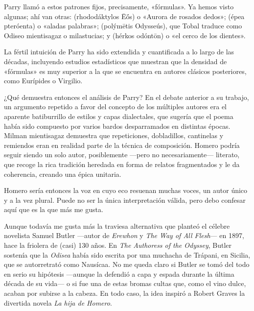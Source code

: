 Parry llamó a estos patrones fijos, precisamente, «fórmulas». Ya hemos visto algunas; ahí van otras:  (rhododáktylos Ēṓs) o «Aurora de rosados dedos»;  (épea pteróenta) o «aladas palabras»;  (polýmētis Odysseús), que Tobal traduce como Odiseo mientisagaz o milastucias; y  (hérkos odóntōn) o «el cerco de los dientes».

La fértil intuición de Parry ha sido extendida y cuantificada a lo largo de las décadas, incluyendo estudios estadísticos que muestran que la densidad de «fórmulas» es muy superior a la que se encuentra en autores clásicos posteriores, como Eurípides o Virgilio.

¿Qué demuestra entonces el análisis de Parry? En el debate anterior a su trabajo, un argumento repetido a favor del concepto de los múltiples autores era el aparente batiburrillo de estilos y capas dialectales, que sugería que el poema había sido compuesto por varios bardos desparramados en distintas épocas. Milman mientisagaz demuestra que repeticiones, dobladillos, cantinelas y remiendos eran en realidad parte de la técnica de composición. Homero podría seguir siendo un solo autor, posiblemente ---pero no necesariamente--- literato, que recoge la rica tradición heredada en forma de relatos fragmentados y le da coherencia, creando una épica unitaria.

Homero sería entonces la voz en cuyo eco resuenan muchas voces, un autor único y a la vez plural. Puede no ser la única interpretación válida, pero debo confesar aquí que es la que más me gusta.

Aunque todavía me gusta más la traviesa alternativa que planteó el célebre novelista Samuel Butler ---autor de \emph{Erewhon} y \emph{The Way of All Flesh}--- en 1897, hace la friolera de (casi) 130 años. En \emph{The Authoress of the Odyssey}, Butler sostenía que la \emph{Odisea} había sido escrita por una muchacha de Trápani, en Sicilia, que se autorretrató como Nausícaa. No me queda claro si Butler se tomó del todo en serio su hipótesis ---aunque la defendió a capa y espada durante la última década de su vida--- o si fue una de estas bromas cultas que, como el vino dulce, acaban por subirse a la cabeza. En todo caso, la idea inspiró a Robert Graves la divertida novela \emph{La hija de Homero}.

